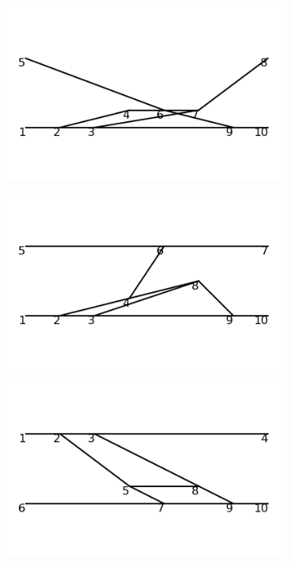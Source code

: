 \documentclass[11pt,a4paper,twoside,pdf]{article}
\numberwithin{equation}{section}
\begin{document}
\begin{figure}[h!]
\begin{subfigure}[t]{0.16\textwidth}
    \end{subfigure}
    \hfill
    \begin{subfigure}[t]{0.16\textwidth}
        \centering
        \includegraphics[width=\textwidth]{plots/order6_2to2/15.png}
    \end{subfigure}
    \hfill
    \begin{subfigure}[t]{0.16\textwidth}
        \centering
        \includegraphics[width=\textwidth]{plots/order6_2to2/16.png}
    \end{subfigure}
    \hfill
    \begin{subfigure}[t]{0.16\textwidth}
        \centering
        \includegraphics[width=\textwidth]{plots/order6_2to2/17.png}

\end{subfigure}
\end{figure}
\end{document}
